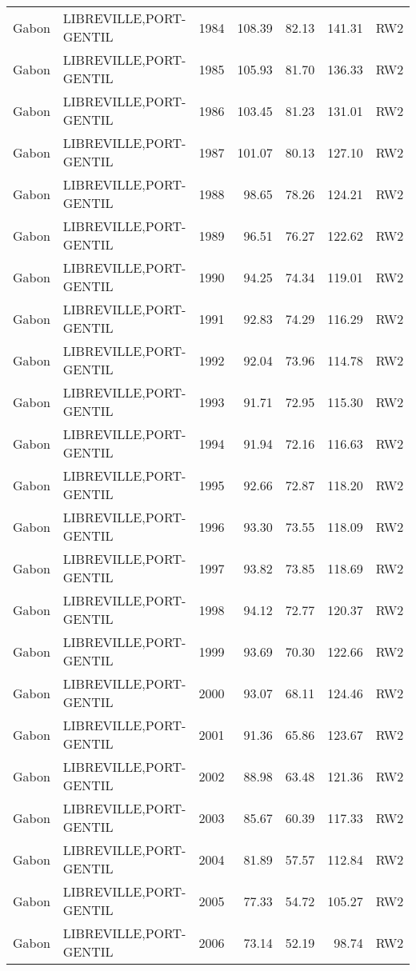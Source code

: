 \begin{longtable}{lllrrrl}
  Gabon & LIBREVILLE,PORT-GENTIL & 1984 & 108.39 & 82.13 & 141.31 & RW2 \\ 
  Gabon & LIBREVILLE,PORT-GENTIL & 1985 & 105.93 & 81.70 & 136.33 & RW2 \\ 
  Gabon & LIBREVILLE,PORT-GENTIL & 1986 & 103.45 & 81.23 & 131.01 & RW2 \\ 
  Gabon & LIBREVILLE,PORT-GENTIL & 1987 & 101.07 & 80.13 & 127.10 & RW2 \\ 
  Gabon & LIBREVILLE,PORT-GENTIL & 1988 & 98.65 & 78.26 & 124.21 & RW2 \\ 
  Gabon & LIBREVILLE,PORT-GENTIL & 1989 & 96.51 & 76.27 & 122.62 & RW2 \\ 
  Gabon & LIBREVILLE,PORT-GENTIL & 1990 & 94.25 & 74.34 & 119.01 & RW2 \\ 
  Gabon & LIBREVILLE,PORT-GENTIL & 1991 & 92.83 & 74.29 & 116.29 & RW2 \\ 
  Gabon & LIBREVILLE,PORT-GENTIL & 1992 & 92.04 & 73.96 & 114.78 & RW2 \\ 
  Gabon & LIBREVILLE,PORT-GENTIL & 1993 & 91.71 & 72.95 & 115.30 & RW2 \\ 
  Gabon & LIBREVILLE,PORT-GENTIL & 1994 & 91.94 & 72.16 & 116.63 & RW2 \\ 
  Gabon & LIBREVILLE,PORT-GENTIL & 1995 & 92.66 & 72.87 & 118.20 & RW2 \\ 
  Gabon & LIBREVILLE,PORT-GENTIL & 1996 & 93.30 & 73.55 & 118.09 & RW2 \\ 
  Gabon & LIBREVILLE,PORT-GENTIL & 1997 & 93.82 & 73.85 & 118.69 & RW2 \\ 
  Gabon & LIBREVILLE,PORT-GENTIL & 1998 & 94.12 & 72.77 & 120.37 & RW2 \\ 
  Gabon & LIBREVILLE,PORT-GENTIL & 1999 & 93.69 & 70.30 & 122.66 & RW2 \\ 
  Gabon & LIBREVILLE,PORT-GENTIL & 2000 & 93.07 & 68.11 & 124.46 & RW2 \\ 
  Gabon & LIBREVILLE,PORT-GENTIL & 2001 & 91.36 & 65.86 & 123.67 & RW2 \\ 
  Gabon & LIBREVILLE,PORT-GENTIL & 2002 & 88.98 & 63.48 & 121.36 & RW2 \\ 
  Gabon & LIBREVILLE,PORT-GENTIL & 2003 & 85.67 & 60.39 & 117.33 & RW2 \\ 
  Gabon & LIBREVILLE,PORT-GENTIL & 2004 & 81.89 & 57.57 & 112.84 & RW2 \\ 
  Gabon & LIBREVILLE,PORT-GENTIL & 2005 & 77.33 & 54.72 & 105.27 & RW2 \\ 
  Gabon & LIBREVILLE,PORT-GENTIL & 2006 & 73.14 & 52.19 & 98.74 & RW2 \\ 

\end{longtable}
